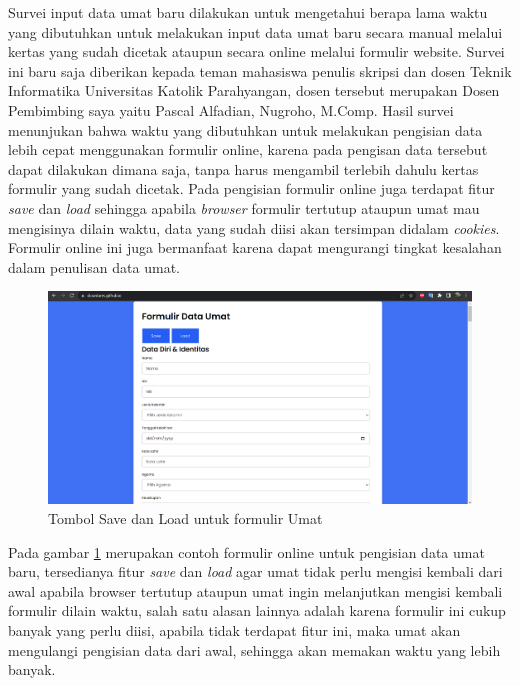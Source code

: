 Survei input data umat baru dilakukan untuk mengetahui berapa lama waktu yang dibutuhkan untuk melakukan input data umat baru secara manual melalui kertas yang sudah dicetak ataupun secara online melalui formulir website. Survei ini baru saja diberikan kepada teman mahasiswa penulis skripsi dan dosen Teknik Informatika Universitas Katolik Parahyangan, dosen tersebut merupakan Dosen Pembimbing saya yaitu Pascal Alfadian, Nugroho, M.Comp. Hasil survei menunjukan bahwa waktu yang dibutuhkan untuk melakukan pengisian data lebih cepat menggunakan formulir online, karena pada pengisan data tersebut dapat dilakukan dimana saja, tanpa harus mengambil terlebih dahulu kertas formulir yang sudah dicetak. Pada pengisian formulir online juga terdapat fitur \textit{save} dan \textit{load} sehingga apabila \textit{browser} formulir tertutup ataupun umat mau mengisinya dilain waktu, data yang sudah diisi akan tersimpan didalam \textit{cookies}. Formulir online ini juga bermanfaat karena dapat mengurangi tingkat kesalahan dalam penulisan data umat.

\begin{figure}[H]
	\centering
	\includegraphics[scale=0.4]{Gambar/formUmat.png}
	\caption{Tombol Save dan Load untuk formulir Umat} 
	\label{fig:loadSave}
\end{figure}

Pada gambar \ref{fig:loadSave} merupakan contoh formulir online untuk pengisian data umat baru, tersedianya fitur \textit{save} dan \textit{load} agar umat tidak perlu mengisi kembali dari awal apabila browser tertutup ataupun umat ingin melanjutkan mengisi kembali formulir dilain waktu, salah satu alasan lainnya adalah karena formulir ini cukup banyak yang perlu diisi, apabila tidak terdapat fitur ini, maka umat akan mengulangi pengisian data dari awal, sehingga akan memakan waktu yang lebih banyak.

